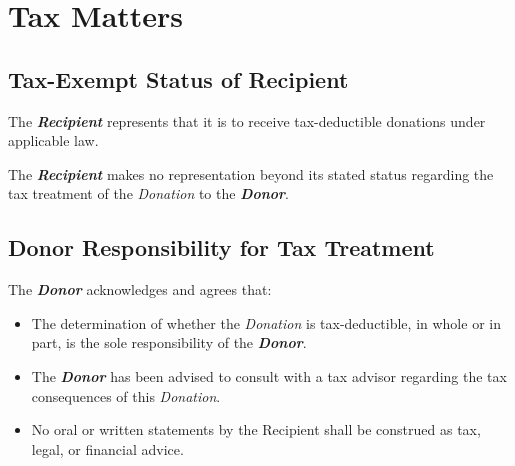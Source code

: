 
\section{Tax Matters}
\label{sec:tax}

\subsection{Tax-Exempt Status of Recipient}

The \textbf{\textit{Recipient}} represents that it is \recipientTaxdeductionEligible{} to receive tax-deductible donations under applicable law.

\vspace{0.3cm}

\noindent The \textbf{\textit{Recipient}} makes no representation beyond its stated status regarding the tax treatment of the \textit{Donation} to the \textbf{\textit{Donor}}.

\subsection{Donor Responsibility for Tax Treatment}

The \textbf{\textit{Donor}} acknowledges and agrees that:
\begin{itemize}
  \item The determination of whether the \textit{Donation} is tax-deductible, in whole or in part, is the sole responsibility of the \textbf{\textit{Donor}}.
  \item The \textbf{\textit{Donor}} has been advised to consult with a tax advisor regarding the tax consequences of this \textit{Donation}.
  \item No oral or written statements by the Recipient shall be construed as tax, legal, or financial advice.
\end{itemize}


